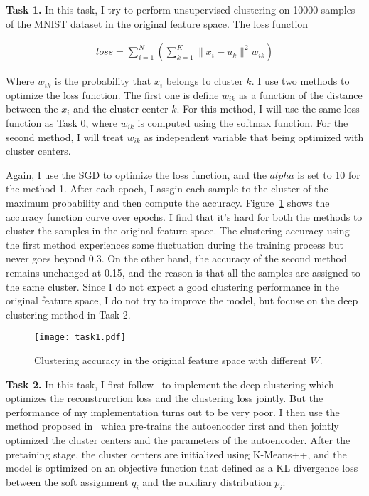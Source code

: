 \documentclass{article}
\begin{document}
\textbf{Task 1.}
\vspace{\baselineskip}
In this task, I try to perform unsupervised clustering on 10000 samples of the MNIST dataset in the original feature space. The loss function

\begin{align*}
  loss = \sum_{i=1}^{N}{\left(\sum_{k=1}^{K}\|x_i-u_k\|^2w_{ik}\right)}
\end{align*}

Where $w_{ik}$ is the probability that $x_i$ belongs to cluster $k$. I use two methods to optimize the loss function. The first one is define $w_{ik}$ as a function of the distance between the $x_i$ and the cluster center $k$. For this method, I will use the same loss function as Task 0, where $w_{ik}$ is computed using the softmax function. For the second method, I will treat $w_{ik}$ as independent variable that being optimized with cluster centers.

Again, I use the SGD to optimize the loss function, and the $alpha$ is set to 10 for the method 1. After each epoch, I assgin each sample to the cluster of the maximum probability and then compute the accuracy. Figure~\ref{fig:task1} shows the accuracy function curve over epochs. I find that it's hard for both the methods to cluster the samples in the original feature space. The clustering accuracy using the first method experiences some fluctuation during the training process but never goes beyond 0.3. On the other hand, the accuracy of the second method remains unchanged at 0.15, and the reason is that all the samples are assigned to the same cluster. Since I do not expect a good clustering performance in the original feature space, I do not try to improve the model, but focuse on the deep clustering method in Task 2.

\begin{figure}[!h]
  \centering
  \texttt{[image: task1.pdf]}
  \caption{Clustering accuracy in the original feature space with different $W$.}
  \label{fig:task1}
\end{figure}


\textbf{Task 2.}
In this task, I first follow~\cite{fard2018deep} to implement the deep clustering which optimizes the reconstrurction loss and the clustering loss jointly. But the performance of my implementation turns out to be very poor. I then use the method proposed in~\cite{xie2016unsupervised} which pre-trains the autoencoder first and then jointly optimized the cluster centers and the parameters of the autoencoder. After the pretaining stage, the cluster centers are initialized using K-Means++, and the model is optimized on an objective function that defined as a KL divergence loss between the soft assignment $q_i$ and the auxiliary distribution $p_i$:
\end{document}
